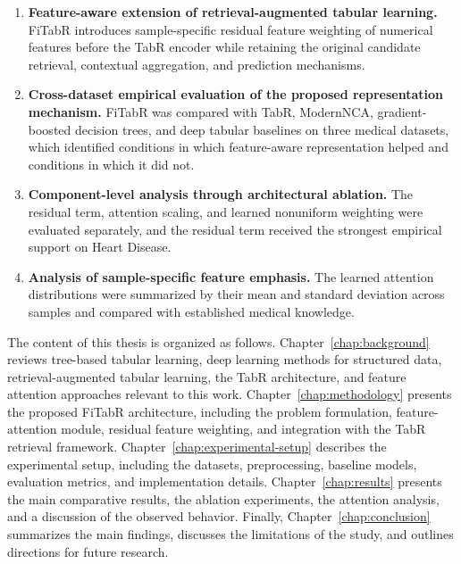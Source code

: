 \documentclass[11pt,a4paper,oneside, openany, reqno, chapter, nokorean]{oblivoir}
\theoremstyle{definition}
\theoremstyle{remark}
\numberwithin{equation}{chapter}
\theoremstyle{definition}
\theoremstyle{remark}
\theoremstyle{definition}
\begin{document}
\begin{enumerate}
    \item \textbf{Feature-aware extension of retrieval-augmented tabular
    learning.}
    FiTabR introduces sample-specific residual feature weighting of numerical features
    before the TabR encoder while retaining the original candidate retrieval,
    contextual aggregation, and prediction mechanisms.

    \item \textbf{Cross-dataset empirical evaluation of the proposed
    representation mechanism.}
    FiTabR was compared with TabR, ModernNCA, gradient-boosted decision trees,
    and deep tabular baselines on three medical datasets, which identified
    conditions in which feature-aware representation helped and conditions in
    which it did not.

    \item \textbf{Component-level analysis through architectural ablation.}
    The residual term, attention scaling, and learned nonuniform weighting
    were evaluated separately, and the residual term received the strongest
    empirical support on Heart Disease.

    \item \textbf{Analysis of sample-specific feature emphasis.}
    The learned attention distributions were summarized by their mean and
    standard deviation across samples and compared with established medical
    knowledge.
\end{enumerate}

The content of this thesis is organized as follows. Chapter~\ref{chap:background} reviews
tree-based tabular learning, deep learning methods for structured data,
retrieval-augmented tabular learning, the TabR architecture, and feature
attention approaches relevant to this work. Chapter~\ref{chap:methodology} presents the proposed
FiTabR architecture, including the problem formulation, feature-attention
module, residual feature weighting, and integration with the TabR retrieval
framework. Chapter~\ref{chap:experimental-setup} describes the experimental setup, including the
datasets, preprocessing, baseline models, evaluation metrics, and
implementation details. Chapter~\ref{chap:results} presents the main comparative results, the
ablation experiments, the attention analysis, and a discussion of the observed
behavior. Finally, Chapter~\ref{chap:conclusion} summarizes the main findings, discusses the
limitations of the study, and outlines directions for future research.
\end{document}
